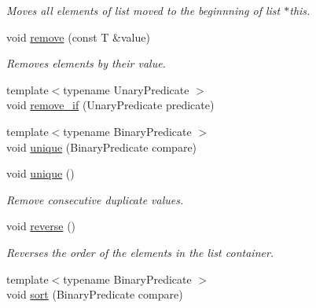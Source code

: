 \begin{DoxyCompactItemize}
\begin{DoxyCompactList}\small\item\em Moves all elements of list {\itshape moved} to the beginnning of list {\itshape $\ast$this}. \end{DoxyCompactList}\item 
\hypertarget{classofeli_1_1list_a6e9d56b7ca0771d3a768b588239a29f3}{void \hyperlink{classofeli_1_1list_a6e9d56b7ca0771d3a768b588239a29f3}{remove} (const T \&value)}\label{classofeli_1_1list_a6e9d56b7ca0771d3a768b588239a29f3}

\begin{DoxyCompactList}\small\item\em Removes elements by their value. \end{DoxyCompactList}\item 
{\footnotesize template$<$typename Unary\-Predicate $>$ }\\void \hyperlink{classofeli_1_1list_a2982d8f3bf7593929fe6ea3a7ad03fc6}{remove\-\_\-if} (Unary\-Predicate predicate)
\item 
{\footnotesize template$<$typename Binary\-Predicate $>$ }\\void \hyperlink{classofeli_1_1list_a640cb310a5241b411436ff39577706b1}{unique} (Binary\-Predicate compare)
\item 
\hypertarget{classofeli_1_1list_abc2cd2b67b1e9aab234cfeb647870f96}{void \hyperlink{classofeli_1_1list_abc2cd2b67b1e9aab234cfeb647870f96}{unique} ()}\label{classofeli_1_1list_abc2cd2b67b1e9aab234cfeb647870f96}

\begin{DoxyCompactList}\small\item\em Remove consecutive duplicate values. \end{DoxyCompactList}\item 
\hypertarget{classofeli_1_1list_a3cd2eabfec966e211118a90ab9d0a5f5}{void \hyperlink{classofeli_1_1list_a3cd2eabfec966e211118a90ab9d0a5f5}{reverse} ()}\label{classofeli_1_1list_a3cd2eabfec966e211118a90ab9d0a5f5}

\begin{DoxyCompactList}\small\item\em Reverses the order of the elements in the {\itshape list} container. \end{DoxyCompactList}\item 
\hypertarget{classofeli_1_1list_aaeedac18b70d233644d84c7ad3a9a3fa}{{\footnotesize template$<$typename Binary\-Predicate $>$ }\\void \hyperlink{classofeli_1_1list_aaeedac18b70d233644d84c7ad3a9a3fa}{sort} (Binary\-Predicate compare)}\label{classofeli_1_1list_aaeedac18b70d233644d84c7ad3a9a3fa}


\end{DoxyCompactItemize}

